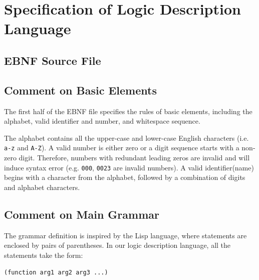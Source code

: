 \documentclass[12pt]{article}
\def\n{\noindent}
\begin{document}
\section{Specification of Logic Description Language}

\subsection{EBNF Source File}



\subsection{Comment on Basic Elements}

The first half of the EBNF file specifies the rules of basic elements, including the
alphabet, valid identifier and number, and whitespace sequence.

\vspace{0.3cm}

\n The alphabet contains all the upper-case and lower-case English characters
(i.e. \texttt{a-z} and \texttt{A-Z}). A valid number is either zero or a digit
sequence starts with a non-zero digit. Therefore, numbers with redundant leading
zeros are invalid and will induce syntax error (e.g. \texttt{000}, \texttt{0023}
are invalid numbers). A valid identifier(name) begins with a character from the
alphabet, followed by a combination of digits and alphabet characters.

\subsection{Comment on Main Grammar}

The grammar definition is inspired by the Lisp language, where statements are
enclosed by pairs of parentheses. In our logic description language, all the
statements take the form:

\vspace{0.3cm}
\n \texttt{(function arg1 arg2 arg3 ...)}
\end{document}
